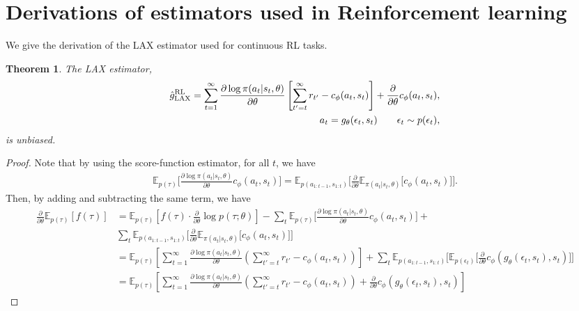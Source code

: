 \documentclass{article}
\newcommand{\E}{\mathbb{E}}
\newcommand{\LL}[1]{\frac{\partial \log \pi(a_{#1}| s_{#1}, \theta)}{\partial \theta}}
\newcommand{\PT}{\frac{\partial}{\partial \theta}}
\newcommand{\LP}[1]{\PT \log p(#1)}
\newcommand{\LAX}{{\textnormal{LAX}}}
\newcommand{\RL}{{\textnormal{RL}}}
\newtheorem{theorem}{Theorem}[section]
\begin{document}



\section{Derivations of estimators used in Reinforcement learning}
\label{rl appendix}
We give the derivation of the \LAX{} estimator used for continuous RL tasks.
\begin{theorem}
The \LAX{} estimator,
\begin{align}
\hat g_\LAX^{\RL} = \sum_{t=1}^{\infty} \LL{t} \left[ \sum_{t'=t}^{\infty} r_{t'} - c_\phi(a_t,s_t) \right] +\frac{\partial}{\partial\theta} c_\phi(a_t, s_t), \\
a_t = g_\theta(\epsilon_t,s_t) \qquad \epsilon_t \sim p(\epsilon_t)\nonumber,
\end{align}
is unbiased.
\end{theorem}
\begin{proof}
Note that by using the score-function estimator, for all $t$, we have 
%
\begin{align}
\E_{p(\tau)}\Big[\LL{t} c_\phi(a_t, s_t)\Big] = \E_{p(a_{1:t-1},s_{1:t})}\Big[\frac{\partial}{\partial\theta}\E_{\pi(a_t|s_t, \theta)}\Big[c_\phi(a_t, s_t)\Big]\Big].
\end{align}
Then, by adding and subtracting the same term, we have
\begin{align*}
\PT\E_{p(\tau)}[f(\tau)] &= \E_{p(\tau)}\left[f(\tau)\cdot\LP{\tau;\theta}\right]-\sum_t\E_{p(\tau)}\Big[\LL{t} c_\phi(a_t, s_t)\Big]+\\&\sum_t \E_{p(a_{1:t-1},s_{1:t})}\Big[\frac{\partial}{\partial\theta}\E_{\pi(a_t|s_t, \theta)}\Big[c_\phi(a_t,s_t)\Big]\Big]\nonumber\\
&= \E_{p(\tau)}\left[ \sum_{t=1}^{\infty} \LL{t}\left(\sum_{t'=t}^{\infty} r_{t'} - c_\phi(a_t,s_t)\right)\right]+\sum_t \E_{p(a_{1:t-1},s_{1:t})}\Big[\E_{p(\epsilon_t)}\Big[\frac{\partial}{\partial\theta}c_\phi(g_\theta(\epsilon_t,s_t), s_t)\Big]\Big]\nonumber\\
&= \E_{p(\tau)}\left[ \sum_{t=1}^{\infty} \LL{t}\left(\sum_{t'=t}^{\infty} r_{t'} - c_\phi(a_t,s_t)\right)+\frac{\partial}{\partial\theta}c_\phi(g_\theta(\epsilon_t,s_t), s_t)\right]\nonumber
\end{align*}
\end{proof}
\end{document}

